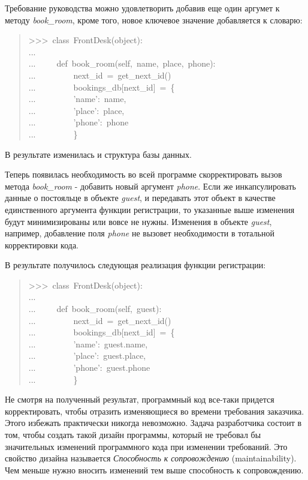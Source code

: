 \documentclass[a4paper,openany,twoside,final]{book}
\providecommand*{\DUroletitlereference}[1]{\textsl{#1}}
\begin{document}
Требование руководства можно удовлетворить добавив еще один аргумет к
методу \DUroletitlereference{book\_room}, кроме того, новое ключевое значение добавляется к
словарю:

\begin{quote}{\ttfamily \raggedright \noindent
>{}>{}>~class~FrontDesk(object):\\
...\\
...~~~~~def~book\_room(self,~name,~place,~phone):\\
...~~~~~~~~~next\_id~=~get\_next\_id()\\
...~~~~~~~~~bookings\_db{[}next\_id{]}~=~\{\\
...~~~~~~~~~'name':~name,\\
...~~~~~~~~~'place':~place,\\
...~~~~~~~~~'phone':~phone\\
...~~~~~~~~~\}
}
\end{quote}

В результате изменилась и структура базы данных.

Теперь появилась необходимость во всей программе скорректировать вызов
метода \DUroletitlereference{book\_room} - добавить новый аргумент \DUroletitlereference{phone}.  Если же
инкапсулировать данные о постояльце в объекте \DUroletitlereference{guest}, и передавать
этот объект в качестве единственного аргумента функции регистрации, то
указанные выше изменения будут минимизированы или вовсе не нужны.
Изменения в объекте \DUroletitlereference{guest}, например, добавление поля \DUroletitlereference{phone} не
вызовет необходимости в тотальной корректировки кода.

В результате получилось следующая реализация функции регистрации:

\begin{quote}{\ttfamily \raggedright \noindent
>{}>{}>~class~FrontDesk(object):\\
...\\
...~~~~~def~book\_room(self,~guest):\\
...~~~~~~~~~next\_id~=~get\_next\_id()\\
...~~~~~~~~~bookings\_db{[}next\_id{]}~=~\{\\
...~~~~~~~~~'name':~guest.name,\\
...~~~~~~~~~'place':~guest.place,\\
...~~~~~~~~~'phone':~guest.phone\\
...~~~~~~~~~\}
}
\end{quote}

Не смотря на полученный результат, программный код все-таки придется
корректировать, чтобы отразить изменяющиеся во времени требования
заказчика.  Этого избежать практически никогда невозможно.  Задача
разработчика состоит в том, чтобы создать такой дизайн программы,
который не требовал бы значительных изменений программного кода при
изменении требований.  Это свойство дизайна называется
\DUroletitlereference{Способность к сопровождению} (maintainability).  Чем меньше нужно вносить
изменений тем выше способность к сопровождению.
\end{document}
